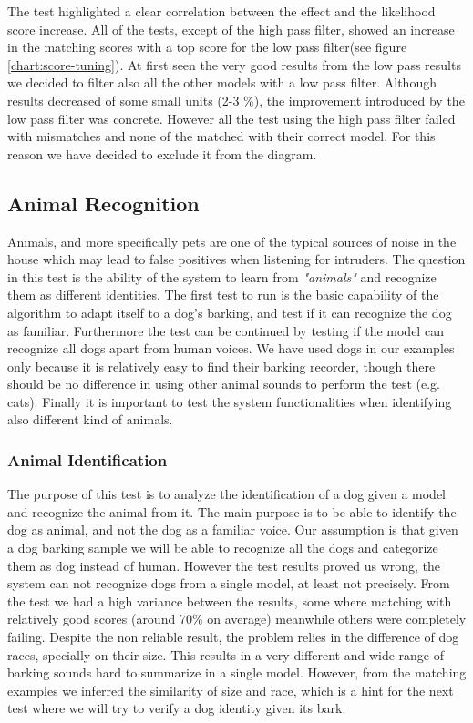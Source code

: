 The test highlighted a clear correlation between the effect and the likelihood score
increase. All of the tests, except of the high pass filter, showed an increase in the
matching scores with a top score for the low pass filter(see figure \ref{chart:score-tuning}). At first seen the very good results
from the low pass results we decided to filter also all the other models with a low pass filter.
Although results decreased of some small units (2-3 \%), the improvement introduced by the
low pass filter was concrete. However all the test using the high pass filter failed with mismatches
and none of the matched with their correct model. For this reason we have decided to exclude it from
the diagram.


\subsection{Animal Recognition}

Animals, and more specifically pets are one of the typical sources of noise in the house
which may lead to false positives when listening for intruders. The question in this test
is the ability of the system to learn from \textit{"animals"} and recognize them as different identities.
The first test to run is the basic capability of the algorithm to adapt itself to a dog's barking,
and test if it can recognize the dog as familiar. Furthermore the test can be continued by testing
if the model can recognize all dogs apart from human voices. We have used dogs in our examples
only because it is relatively easy to find their barking recorder, though there should be no
difference in using other animal sounds to perform the test (e.g. cats).
Finally it is important to test
the system functionalities when identifying also different kind of animals.

\subsubsection{Animal Identification}

The purpose of this test is to analyze the identification of a dog given a model
and recognize the animal from it. The main purpose is to be able to identify
the dog as animal, and not the dog as a familiar voice. Our assumption is that
given a dog barking sample we will be able to recognize all the dogs and categorize
them as dog instead of human. \newline
However the test results proved us wrong, the system can not recognize dogs from a single
model, at least not precisely. From the test we had a high variance between the results, some
where matching with relatively good scores (around 70\% on average) meanwhile others
were completely failing. Despite the non reliable result, the problem relies in the
difference of dog races, specially on their size. This results in a very different
and wide range of barking sounds hard to summarize in a single model. However, from
the matching examples we inferred the similarity of size and race, which is a hint for
the next test where we will try to verify a dog identity given its bark.

